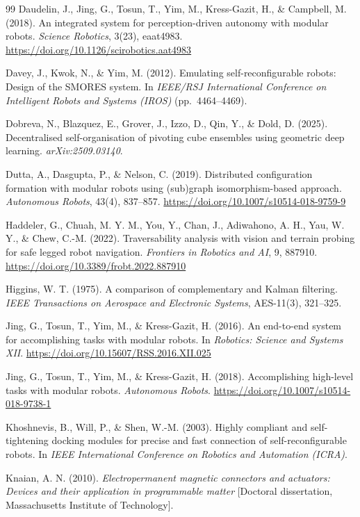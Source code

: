 \documentclass[11pt,a4paper]{article}
\begin{document}
{\begin{thebibliography}{99}
Daudelin, J., Jing, G., Tosun, T., Yim, M., Kress-Gazit, H., \& Campbell, M.
(2018). An integrated system for perception-driven autonomy with modular
robots. \textit{Science Robotics}, 3(23), eaat4983.
\url{https://doi.org/10.1126/scirobotics.aat4983}

Davey, J., Kwok, N., \& Yim, M. (2012). Emulating self-reconfigurable robots:
Design of the SMORES system. In \textit{IEEE/RSJ International Conference on
Intelligent Robots and Systems (IROS)} (pp.\ 4464--4469).

Dobreva, N., Blazquez, E., Grover, J., Izzo, D., Qin, Y., \& Dold, D. (2025).
Decentralised self-organisation of pivoting cube ensembles using geometric deep
learning. \textit{arXiv:2509.03140}.

Dutta, A., Dasgupta, P., \& Nelson, C. (2019). Distributed configuration
formation with modular robots using (sub)graph isomorphism-based approach.
\textit{Autonomous Robots}, 43(4), 837--857.
\url{https://doi.org/10.1007/s10514-018-9759-9}

Haddeler, G., Chuah, M. Y. M., You, Y., Chan, J., Adiwahono, A. H., Yau, W. Y.,
\& Chew, C.-M. (2022). Traversability analysis with vision and terrain probing
for safe legged robot navigation. \textit{Frontiers in Robotics and AI}, 9,
887910. \url{https://doi.org/10.3389/frobt.2022.887910}

Higgins, W. T. (1975). A comparison of complementary and Kalman filtering.
\textit{IEEE Transactions on Aerospace and Electronic Systems}, AES-11(3),
321--325.

Jing, G., Tosun, T., Yim, M., \& Kress-Gazit, H. (2016). An end-to-end system
for accomplishing tasks with modular robots. In \textit{Robotics: Science and
Systems XII}. \url{https://doi.org/10.15607/RSS.2016.XII.025}

Jing, G., Tosun, T., Yim, M., \& Kress-Gazit, H. (2018). Accomplishing
high-level tasks with modular robots. \textit{Autonomous Robots}.
\url{https://doi.org/10.1007/s10514-018-9738-1}

Khoshnevis, B., Will, P., \& Shen, W.-M. (2003). Highly compliant and
self-tightening docking modules for precise and fast connection of
self-reconfigurable robots. In \textit{IEEE International Conference on
Robotics and Automation (ICRA)}.

Knaian, A. N. (2010). \textit{Electropermanent magnetic connectors and
actuators: Devices and their application in programmable matter}
[Doctoral dissertation, Massachusetts Institute of Technology].


\end{thebibliography}}
\end{document}
